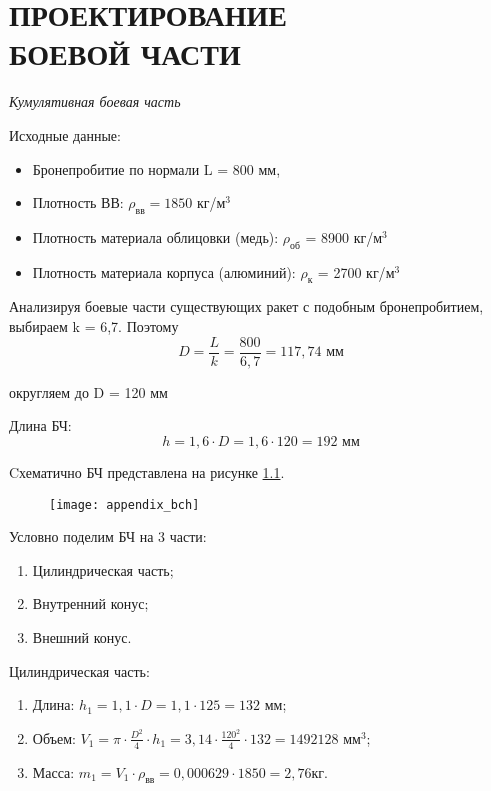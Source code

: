 \chapter{\centeering ПРОЕКТИРОВАНИЕ \\ \centeering БОЕВОЙ ЧАСТИ}
\label{cha:appendix_bch}
\emph{Кумулятивная боевая часть}

Исходные данные:
\begin{itemize}
	\item Бронепробитие по нормали 				L = 800 мм,
	\item Плотность ВВ:							$\rho_\text{вв} = 1850$ кг/$\text{м}^3$
	\item Плотность материала облицовки (медь):			$\rho_\text{об}$ = 8900 кг/$\text{м}^3$
	\item Плотность материала корпуса (алюминий):		$\rho_\text{к}$ = 2700 кг/$\text{м}^3$
\end{itemize}

Анализируя боевые части существующих ракет с подобным бронепробитием, выбираем k = 6,7. Поэтому 
$$ D=\frac{L}{k}=\frac{800}{6,7}=117,74 \text{ мм}$$

округляем до D = 120 мм

Длина БЧ:		$$ h=1,6 \cdot D=1,6 \cdot 120=192 \text{ мм}$$

Cхематично БЧ представлена на рисунке \ref{fig:appendix_bch}.
\begin{figure}
	\begin{center}
		\texttt{[image: appendix\_bch]}
		\caption{}
		\label{fig:appendix_bch}
	\end{center}
\end{figure}

\clearpage
Условно поделим БЧ на 3 части:
\begin{enumerate}
	\item Цилиндрическая часть;
	\item Внутренний конус;
	\item Внешний конус.
\end{enumerate}

Цилиндрическая часть: 
\begin{enumerate}
	\item Длина: 	$h_1=1,1 \cdot D=1,1 \cdot 125 =132$ мм;
	\item Объем: 	$V_1=\pi \cdot \frac{D^2}{4} \cdot h_1=3,14 \cdot \frac{120^2}{4} \cdot 132 = 1492128 \text{ мм}^3 $;
	\item Масса:	$m_1=V_1 \cdot \rho_\text{вв}=0,000629 \cdot 1850=2,76 кг$.
\end{enumerate}


